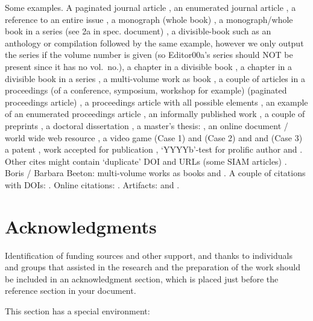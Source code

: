 \documentclass[
acmsmall,
nonacm,
screen,
acmthm]{../templates/acmart}
\begin{document}
Some examples. A paginated journal article \citep{Abril07}, an
enumerated journal article \citep{Cohen07}, a reference to an entire
issue \citep{JCohen96}, a monograph (whole book) \citep{Kosiur01}, a
monograph/whole book in a series (see 2a in spec. document)
\citep{Harel79}, a divisible-book such as an anthology or compilation
\citep{Editor00} followed by the same example, however we only output
the series if the volume number is given \citep{Editor00a} (so
Editor00a's series should NOT be present since it has no vol.~no.), a
chapter in a divisible book \citep{Spector90}, a chapter in a divisible
book in a series \citep{Douglass98}, a multi-volume work as book
\citep{Knuth97}, a couple of articles in a proceedings (of a conference,
symposium, workshop for example) (paginated proceedings article)
\citep{Andler79, Hagerup1993}, a proceedings article with all possible
elements \citep{Smith10}, an example of an enumerated proceedings
article \citep{VanGundy07}, an informally published work
\citep{Harel78}, a couple of preprints
\citep{Bornmann2019, AnzarootPBM14}, a doctoral dissertation
\citep{Clarkson85}, a master's thesis: \citep{anisi03}, an online
document / world wide web resource
\citep{Thornburg01, Ablamowicz07, Poker06}, a video game (Case 1)
\citep{Obama08} and (Case 2) \citep{Novak03} and \citep{Lee05} and (Case
3) a patent \citep{JoeScientist001}, work accepted for publication
\citep{rous08}, `YYYYb'-test for prolific author \citep{SaeediMEJ10} and
\citep{SaeediJETC10}. Other cites might contain `duplicate' DOI and URLs
(some SIAM articles) \citep{Kirschmer:2010:AEI:1958016.1958018}. Boris /
Barbara Beeton: multi-volume works as books \citep{MR781536} and
\citep{MR781537}. A couple of citations with DOIs:
\citep{2004:ITE:1009386.1010128, Kirschmer:2010:AEI:1958016.1958018}.
Online citations: \citep{TUGInstmem, Thornburg01, CTANacmart}.
Artifacts: \citep{R} and \citep{UMassCitations}.

\hypertarget{acknowledgments}{%
\section{Acknowledgments}\label{acknowledgments}}

Identification of funding sources and other support, and thanks to
individuals and groups that assisted in the research and the preparation
of the work should be included in an acknowledgment section, which is
placed just before the reference section in your document.

This section has a special environment:
\end{document}
